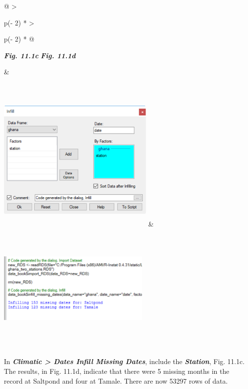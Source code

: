 \documentclass[
  letterpaper,
  DIV=11,
  numbers=noendperiod]{scrreprt}
\begin{document}
\begin{longtable}[]{@{}
  >{\raggedright\arraybackslash}p{(\columnwidth - 2\tabcolsep) * }
  >{\raggedright\arraybackslash}p{(\columnwidth - 2\tabcolsep) * }@{}}
\toprule\noalign{}
\begin{minipage}[b]{\linewidth}\raggedright
\textbf{\emph{Fig. 11.1c}} \textbf{\emph{Fig. 11.1d}}
\end{minipage} & \begin{minipage}[b]{\linewidth}\raggedright
\end{minipage} \\
\midrule\noalign{}
\endhead
\bottomrule\noalign{}
\endlastfoot
\includegraphics[width=3.03243in,height=2.83534in]{figures/Fig11.1c.png}
&
\includegraphics[width=2.95096in,height=2.53564in]{figures/Fig11.1d.png} \\
\end{longtable}

In \textbf{\emph{Climatic \textgreater{} Dates Infill Missing Dates}},
include the \textbf{\emph{Station}}, Fig. 11.1c. The results, in Fig.
11.1d, indicate that there were 5 missing months in the record at
Saltpond and four at Tamale. There are now 53297 rows of data.
\end{document}
